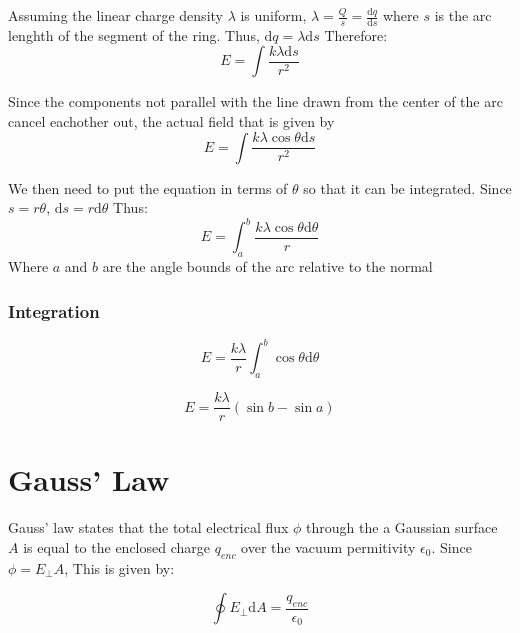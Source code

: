 \documentclass[a4paper,12pt]{article}
\begin{document}
								Assuming the linear charge density $\lambda$ is uniform, $\lambda = \frac{Q}{s} = \frac{\mathrm{d}{q}}{\mathrm{d}s}$ where $s$ is the arc lenghth of the segment of the ring. Thus, $\mathrm{d}q = \lambda \mathrm{d}s$ Therefore:
								\begin{equation*}
										E = \int \frac{k\lambda \mathrm{d}s}{r^{2}}
								\end{equation*}

								Since the components not parallel with the line drawn from the center of the arc cancel eachother out, the actual field that is given by 
								\begin{equation*}
										E = \int \frac{k\lambda \cos{\theta} \mathrm{d}s}{r^{2}}
								\end{equation*}

								We then need to put the equation in terms of $\theta$ so that it can be integrated. Since $s = r\theta$, $\mathrm{d}s = r\mathrm{d}\theta$ Thus:
								\begin{equation*}
										E = \int_{a}^{b} \frac{k\lambda \cos{\theta}\mathrm{d}\theta}{r}
								\end{equation*}
								Where $a$ and $b$ are the angle bounds of the arc relative to the normal

						\subsubsection{Integration}
								\begin{equation*}
										E =\frac{k\lambda}{r}  \int_{a}^{b} \cos{\theta}\mathrm{d}\theta
								\end{equation*}

								\begin{equation*}
										E = \frac{k\lambda}{r} (\sin{b} - \sin{a})
								\end{equation*}
				\setcounter{subsubsection}{0}
		\setcounter{subsection}{0}
		\section{Gauss' Law}
				Gauss' law states that the total electrical flux $\phi$ through the a Gaussian surface $A$ is equal to the enclosed charge $q_{enc}$ over the vacuum permitivity $\epsilon_{0}$. Since $\phi = E_{\bot} A$, This is given by:

				\begin{equation*}
						\oint E_{ \bot} \mathrm{d}A = \frac{q_{enc}}{\epsilon_{0}}
				\end{equation*}
\end{document}
